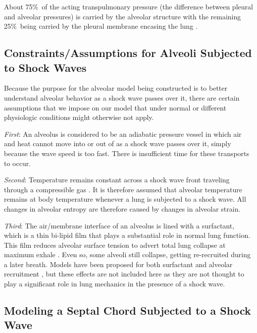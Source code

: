 About 75\%\ of the acting transpulmonary pressure (the difference between pleural and alveolar pressures) is carried by the alveolar structure with the remaining 25\%\ being carried by the pleural membrane encasing the lung \cite{Hajjietal79}.

\subsection{Constraints\slash Assumptions for Alveoli Subjected to Shock Waves}

Because the purpose for the alveolar model being constructed is to better understand alveolar behavior as a shock wave passes over it, there are certain assumptions that we impose on our model that under normal or different physiologic conditions might otherwise not apply.  

\textit{First\/}: An alveolus is considered to be an adiabatic pressure vessel in which air and heat cannot move into or out of as a shock wave passes over it, simply because the wave speed is too fast.  There is insufficient time for these transports to occur.

\textit{Second\/}: Temperature remains constant across a shock wave front traveling through a compressible gas \cite{AmesStaff53}.  It is therefore assumed that alveolar temperature remains at body temperature whenever a lung is subjected to a shock wave.  All changes in alveolar entropy are therefore caused by changes in alveolar strain.

\textit{Third\/}: The air\slash membrane interface of an alveolus is lined with a surfactant, which is a thin bi-lipid film that plays a substantial role in normal lung function.  This film reduces alveolar surface tension to advert total lung collapse at maximum exhale \cite{Stamenovic90}.  Even so, some alveoli still collapse, getting re-recruited during a later breath.  Models have been proposed for both surfactant \cite{Hills99} and alveolar recruitment \cite{Bates07}, but these effects are not included here as they are not thought to play a significant role in lung mechanics in the presence of a shock wave. 

\subsection{Modeling a Septal Chord Subjected to a Shock Wave}


